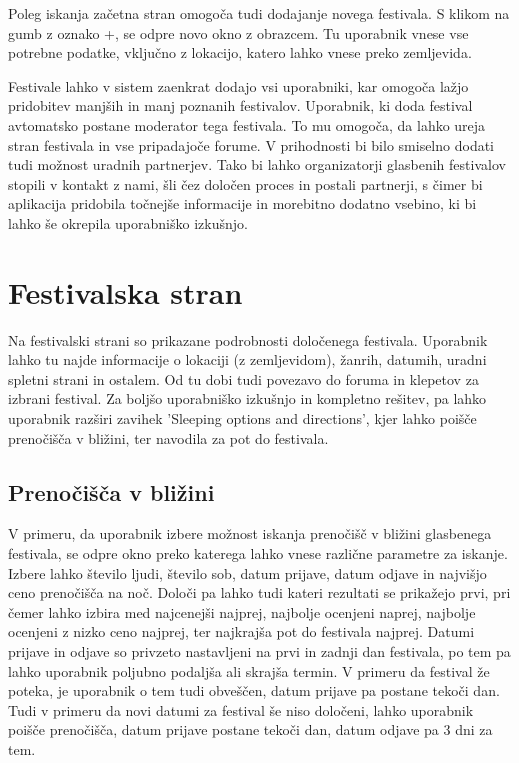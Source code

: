 \documentclass[a4paper,12pt,openright]{book}
\begin{document}
Poleg iskanja začetna stran omogoča tudi dodajanje novega festivala.
S klikom na gumb z oznako +, se odpre novo okno z obrazcem.
Tu uporabnik vnese vse potrebne podatke, vključno z lokacijo, katero lahko vnese preko zemljevida.

Festivale lahko v sistem zaenkrat dodajo vsi uporabniki, kar omogoča lažjo pridobitev manjših in manj poznanih festivalov.
Uporabnik, ki doda festival avtomatsko postane moderator tega festivala.
To mu omogoča, da lahko ureja stran festivala in vse pripadajoče forume.
V prihodnosti bi bilo smiselno dodati tudi možnost uradnih partnerjev.
Tako bi lahko organizatorji glasbenih festivalov stopili v kontakt z nami, šli čez določen proces in postali partnerji, s čimer bi aplikacija pridobila točnejše informacije in morebitno dodatno vsebino, ki bi lahko še okrepila uporabniško izkušnjo.

\section{Festivalska stran}
Na festivalski strani so prikazane podrobnosti določenega festivala.
Uporabnik lahko tu najde informacije o lokaciji (z zemljevidom), žanrih, datumih, uradni spletni strani in ostalem.
Od tu dobi tudi povezavo do foruma in klepetov za izbrani festival.
Za boljšo uporabniško izkušnjo in kompletno rešitev, pa lahko uporabnik razširi zavihek 'Sleeping options and directions', kjer lahko poišče prenočišča v bližini, ter navodila za pot do festivala.

\subsection{Prenočišča v bližini}
V primeru, da uporabnik izbere možnost iskanja prenočišč v bližini glasbenega festivala, se odpre okno preko katerega lahko vnese različne parametre za iskanje.
Izbere lahko število ljudi, število sob, datum prijave, datum odjave in najvišjo ceno prenočišča na noč.
Določi pa lahko tudi kateri rezultati se prikažejo prvi, pri čemer lahko izbira med najcenejši najprej, najbolje ocenjeni naprej, najbolje ocenjeni z nizko ceno najprej, ter najkrajša pot do festivala najprej.
Datumi prijave in odjave so privzeto nastavljeni na prvi in zadnji dan festivala, po tem pa lahko uporabnik poljubno podaljša ali skrajša termin.
V primeru da festival že poteka, je uporabnik o tem tudi obveščen, datum prijave pa postane tekoči dan.
Tudi v primeru da novi datumi za festival še niso določeni, lahko uporabnik poišče prenočišča, datum prijave postane tekoči dan, datum odjave pa 3 dni za tem.
\end{document}
